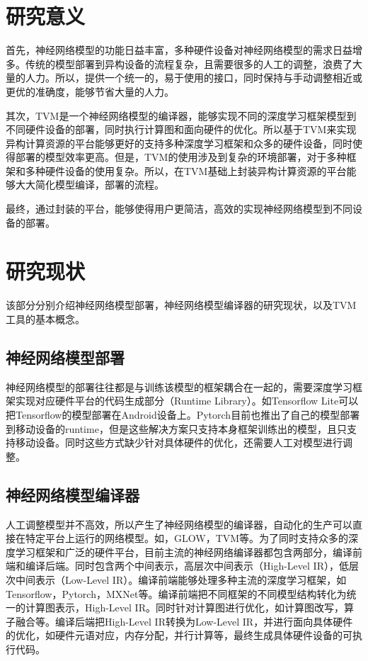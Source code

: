 \section{研究意义}

首先，神经网络模型的功能日益丰富，多种硬件设备对神经网络模型的需求日益增多。传统的模型部署到异构设备的流程复杂，且需要很多的人工的调整，浪费了大量的人力。所以，提供一个统一的，易于使用的接口，同时保持与手动调整相近或更优的准确度，能够节省大量的人力。

其次，TVM是一个神经网络模型的编译器，能够实现不同的深度学习框架模型到不同硬件设备的部署，同时执行计算图和面向硬件的优化。所以基于TVM来实现异构计算资源的平台能够更好的支持多种深度学习框架和众多的硬件设备，同时使得部署的模型效率更高。但是，TVM的使用涉及到复杂的环境部署，对于多种框架和多种硬件设备的使用复杂。所以，在TVM基础上封装异构计算资源的平台能够大大简化模型编译，部署的流程。

最终，通过封装的平台，能够使得用户更简洁，高效的实现神经网络模型到不同设备的部署。

\section{研究现状}

该部分分别介绍神经网络模型部署，神经网络模型编译器的研究现状，以及TVM工具的基本概念。

\subsection{神经网络模型部署}

神经网络模型的部署往往都是与训练该模型的框架耦合在一起的，需要深度学习框架实现对应硬件平台的代码生成部分（Runtime Library）。如Tensorflow Lite可以把Tensorflow的模型部署在Android设备上。Pytorch目前也推出了自己的模型部署到移动设备的runtime，但是这些解决方案只支持本身框架训练出的模型，且只支持移动设备。同时这些方式缺少针对具体硬件的优化，还需要人工对模型进行调整。

\subsection{神经网络模型编译器}

人工调整模型并不高效，所以产生了神经网络模型的编译器，自动化的生产可以直接在特定平台上运行的网络模型。如，GLOW，TVM等。为了同时支持众多的深度学习框架和广泛的硬件平台，目前主流的神经网络编译器都包含两部分，编译前端和编译后端。同时包含两个中间表示，高层次中间表示（High-Level IR），低层次中间表示（Low-Level IR）。编译前端能够处理多种主流的深度学习框架，如Tensorflow，Pytorch，MXNet等。编译前端把不同框架的不同模型结构转化为统一的计算图表示，High-Level IR。同时针对计算图进行优化，如计算图改写，算子融合等。编译后端把High-Level IR转换为Low-Level IR，并进行面向具体硬件的优化，如硬件元语对应，内存分配，并行计算等，最终生成具体硬件设备的可执行代码。


